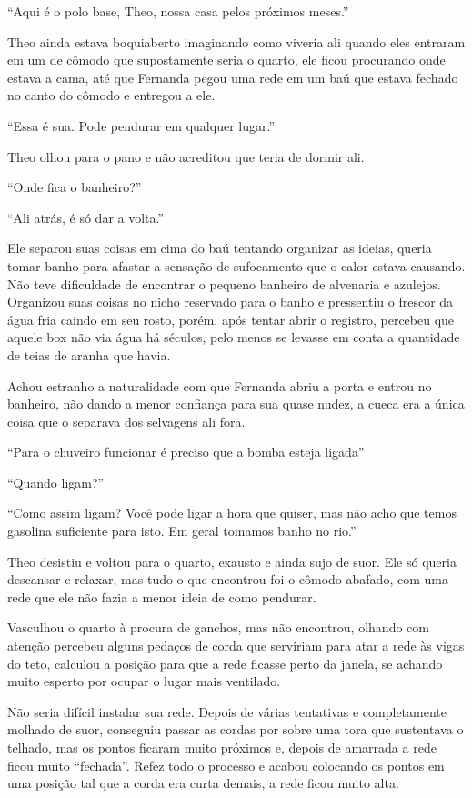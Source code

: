 ``Aqui é o polo base, Theo, nossa casa pelos próximos meses.''

Theo ainda estava boquiaberto imaginando como viveria ali quando eles
entraram em um de cômodo que supostamente seria o quarto, ele ficou
procurando onde estava a cama, até que Fernanda pegou uma rede em um baú
que estava fechado no canto do cômodo e entregou a ele.

``Essa é sua. Pode pendurar em qualquer lugar.''

Theo olhou para o pano e não acreditou que teria de dormir ali.

``Onde fica o banheiro?''

``Ali atrás, é só dar a volta.''

Ele separou suas coisas em cima do baú tentando organizar as ideias,
queria tomar banho para afastar a sensação de sufocamento que o calor
estava causando. Não teve dificuldade de encontrar o pequeno banheiro de
alvenaria e azulejos. Organizou suas coisas no nicho reservado para o
banho e pressentiu o frescor da água fria caindo em seu rosto, porém,
após tentar abrir o registro, percebeu que aquele box não via água há
séculos, pelo menos se levasse em conta a quantidade de teias de aranha
que havia.

Achou estranho a naturalidade com que Fernanda abriu a porta e entrou no
banheiro, não dando a menor confiança para sua quase nudez, a cueca era
a única coisa que o separava dos selvagens ali fora.

``Para o chuveiro funcionar é preciso que a bomba esteja ligada''

``Quando ligam?''

``Como assim ligam? Você pode ligar a hora que quiser, mas não acho que
temos gasolina suficiente para isto. Em geral tomamos banho no rio.''

Theo desistiu e voltou para o quarto, exausto e ainda sujo de suor. Ele
só queria descansar e relaxar, mas tudo o que encontrou foi o cômodo
abafado, com uma rede que ele não fazia a menor ideia de como pendurar.

Vasculhou o quarto à procura de ganchos, mas não encontrou, olhando com
atenção percebeu alguns pedaços de corda que serviriam para atar a rede
às vigas do teto, calculou a posição para que a rede ficasse perto da
janela, se achando muito esperto por ocupar o lugar mais ventilado.

Não seria difícil instalar sua rede. Depois de várias tentativas e
completamente molhado de suor, conseguiu passar as cordas por sobre uma
tora que sustentava o telhado, mas os pontos ficaram muito próximos e,
depois de amarrada a rede ficou muito ``fechada''. Refez todo o processo e
acabou colocando os pontos em uma posição tal que a corda era curta
demais, a rede ficou muito alta.

